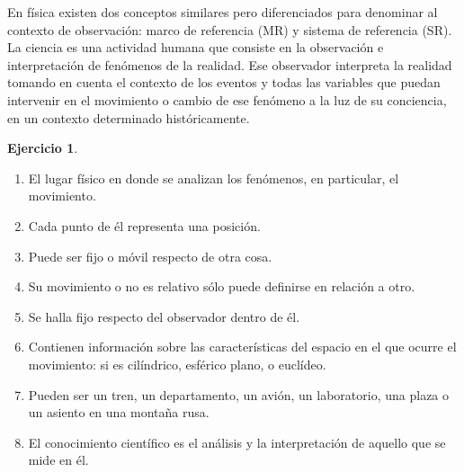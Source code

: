 \documentclass[a4paper,12pt,twoside]{book}
\newtheorem{ejercicio}{{Ejercicio}}[chapter]
\begin{document}
\begin{mdframed}[style=explicacion]
    En física existen dos conceptos similares pero diferenciados para denominar al contexto de observación: marco de referencia (MR) y sistema de referencia (SR). 
    La ciencia es una actividad humana que consiste en la observación e interpretación de fenómenos de la realidad. Ese observador interpreta la realidad tomando en cuenta el contexto de los eventos y todas las variables que puedan intervenir en el movimiento o cambio de ese fenómeno a la luz de su conciencia, en un contexto determinado históricamente.
\end{mdframed}

\begin{mdframed}[style=ejercicio-conceptual]
    \begin{ejercicio}
    \end{ejercicio}
    
    \begin{enumerate}
        \item El lugar físico en donde se analizan los fenómenos, en particular, el movimiento.
        
        \item Cada punto de él representa una posición.
        
        \item Puede ser fijo o móvil respecto de otra cosa.
        
        \item Su movimiento o no es relativo sólo puede definirse en relación a otro.
        
        \item Se halla fijo respecto del observador dentro de él.
        
        \item Contienen información sobre las características del espacio en el que ocurre el movimiento: si es cilíndrico, esférico plano, o euclídeo.
        
        \item Pueden ser un tren, un departamento, un avión, un laboratorio, una plaza o un asiento en una montaña rusa.
        
        \item El conocimiento científico es el análisis y la interpretación de aquello que se mide en él.
        

\end{enumerate}
\end{mdframed}
\end{document}
